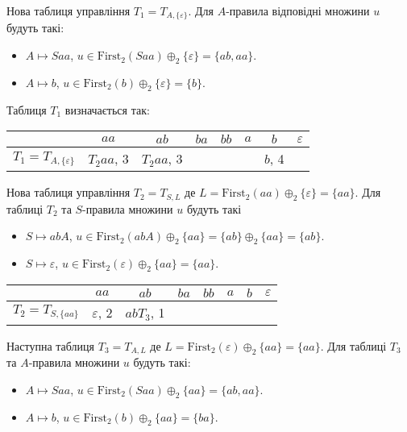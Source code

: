 Нова таблиця управління $T_1 = T_{A, \{\varepsilon\}}$. Для $A$-правила відповідні множини $u$ будуть такі:
\begin{itemize}
	\item $A \mapsto Saa$, $u \in \text{First}_2(Saa) \oplus_2 \{\varepsilon\} = \{ab, aa\}$.
	\item $A \mapsto b$, $u \in \text{First}_2(b) \oplus_2 \{\varepsilon\} = \{b\}$.
\end{itemize}

Таблиця $T_1$ визначається так:
\begin{table}[H]
	\centering
	\begin{tabular}{|c|c|c|c|c|c|c|c|}
		\hline
		 & $aa$ & $ab$ & $ba$ & $bb$ & $a$ & $b$ & $\varepsilon$ \\ \hline
		$T_1 = T_{A, \{\varepsilon\}}$ & $T_2aa$, 3 & $T_2aa$, 3 &  &  &  & $b$, 4 &  \\ \hline
	\end{tabular}
\end{table}

Нова таблиця управління $T_2 = T_{S, L}$ де $L = \text{First}_2 (aa) \oplus_2 \{\varepsilon\} = \{aa\}$. Для таблиці $T_2$ та $S$-правила множини $u$ будуть такі
\begin{itemize}
	\item $S \mapsto abA$, $u \in \text{First}_2(abA) \oplus_2 \{aa\} = \{ab\} \oplus_2 \{aa\} = \{ab\}$.
	\item $S \mapsto \varepsilon$, $u \in \text{First}_2(\varepsilon) \oplus_2 \{aa\} = \{aa\}$.
\end{itemize}

\begin{table}[H]
	\centering
	\begin{tabular}{|c|c|c|c|c|c|c|c|}
		\hline
		 & $aa$ & $ab$ & $ba$ & $bb$ & $a$ & $b$ & $\varepsilon$ \\ \hline
		$T_2 = T_{S, \{aa\}}$ & $\varepsilon$, 2 & $abT_3$, 1 &  &  &  &  &  \\ \hline
	\end{tabular}
\end{table}

Наступна таблиця $T_3 = T_{A, L}$ де $L = \text{First}_2(\varepsilon) \oplus_2 \{aa\} = \{aa\}$. Для таблиці $T_3$ та $A$-правила множини $u$ будуть такі:
\begin{itemize}
	\item $A \mapsto Saa$, $u \in \text{First}_2(Saa) \oplus_2 \{aa\} = \{ab, aa\}$.
	\item $A \mapsto b$, $u \in \text{First}_2(b) \oplus_2 \{aa\} = \{ba\}$.
\end{itemize}


